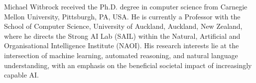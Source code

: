 \documentclass[journal]{IEEEtran}
\begin{document}
\begin{IEEEbiographynophoto}{Michael Witbrock}
received the Ph.D. degree in computer science from Carnegie Mellon University, Pittsburgh, PA, USA.
He is currently a Professor with the School of Computer Science, University of Auckland, Auckland, New Zealand, where he directs the Strong AI Lab (SAIL) within the Natural, Artificial and Organisational Intelligence Institute (NAOI).
His research interests lie at the intersection of machine learning, automated reasoning, and natural language understanding, with an emphasis on the beneficial societal impact of increasingly capable AI.
\end{IEEEbiographynophoto}
\fi
\end{document}
